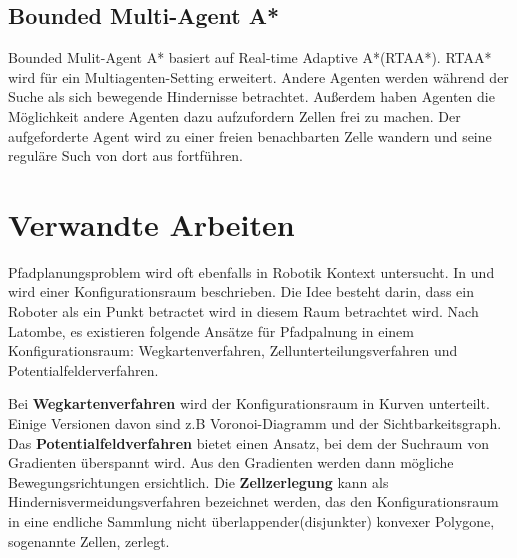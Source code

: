 \subsection{Bounded Multi-Agent A*}
Bounded Mulit-Agent A* basiert auf Real-time Adaptive A*(RTAA*). RTAA* wird für ein Multiagenten-Setting erweitert. Andere Agenten werden während der Suche als sich bewegende Hindernisse betrachtet. Außerdem haben Agenten die Möglichkeit andere Agenten dazu aufzufordern Zellen frei zu machen. Der aufgeforderte Agent wird zu einer freien benachbarten Zelle wandern und seine reguläre Such von dort aus fortführen\cite{Sigurdson.2019}.

\section{Verwandte Arbeiten} 
Pfadplanungsproblem wird oft ebenfalls in Robotik Kontext untersucht. In \cite{lozano} und \cite{latombe} wird einer Konfigurationsraum beschrieben. Die Idee besteht darin, dass ein Roboter als ein Punkt betractet wird in diesem Raum betrachtet wird. Nach Latombe\cite{latombe}, es existieren folgende Ansätze für Pfadpalnung in einem Konfigurationsraum: Wegkartenverfahren, Zellunterteilungsverfahren und Potentialfelderverfahren.


Bei \textbf{Wegkartenverfahren} wird der Konfigurationsraum in Kurven unterteilt. Einige Versionen davon sind z.B Voronoi-Diagramm\cite{voronoi} und der \linebreak Sichtbarkeitsgraph\cite{visG1}. Das \textbf{Potentialfeldverfahren} bietet einen Ansatz, bei dem der Suchraum von Gradienten überspannt wird. Aus den Gradienten werden dann mögliche Bewegungsrichtungen ersichtlich. Die \textbf{Zellzerlegung}\cite{cd} kann als Hindernisvermeidungsverfahren bezeichnet werden, das den Konfigurationsraum in eine endliche Sammlung nicht überlappender(disjunkter) konvexer Polygone, sogenannte Zellen, zerlegt.
